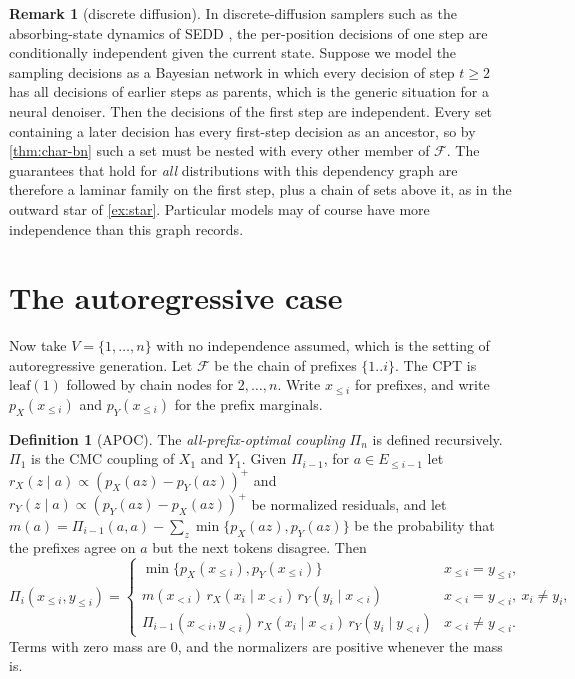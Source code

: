 \documentclass[11pt]{article}
\theoremstyle{definition}
\newtheorem{definition}[theorem]{Definition}
\newtheorem{remark}[theorem]{Remark}
\newcommand{\pX}{p_X}
\newcommand{\pY}{p_Y}
\newcommand{\pos}[1]{\left(#1\right)^{+}}
\newcommand{\Var}{V}
\newcommand{\F}{\mathcal{F}}
\begin{document}
\begin{remark}[discrete diffusion]
In discrete-diffusion samplers such as the absorbing-state dynamics of SEDD
\cite{lou2024discrete}, the per-position decisions of one step are
conditionally independent given the current state. Suppose we model the
sampling decisions as a Bayesian network in which every decision of step
$t\ge2$ has all decisions of earlier steps as parents, which is the generic
situation for a neural denoiser. Then the decisions of the first step are
independent. Every set containing a later decision has every first-step
decision as an ancestor, so by \cref{thm:char-bn} such a set must be nested with
every other member of $\F$. The guarantees that hold for \emph{all} distributions
with this dependency graph are therefore a laminar family on the first step,
plus a chain of sets above it, as in the outward star of \cref{ex:star}.
Particular models may of course have more independence than this graph records.
\end{remark}

\section{The autoregressive case}\label{sec:autoregressive}

Now take $\Var=\{1,\dots,n\}$ with no independence assumed, which is the
setting of autoregressive generation. Let $\F$ be the chain of prefixes
$\{1..i\}$. The CPT is $\mathrm{leaf}(1)$ followed by chain nodes for
$2,\dots,n$. Write $x_{\le i}$ for prefixes, and write $\pX(x_{\le i})$ and
$\pY(x_{\le i})$ for the prefix marginals.

\begin{definition}[APOC]
The \emph{all-prefix-optimal coupling} $\Pi_n$ is defined recursively. $\Pi_1$
is the CMC coupling of $X_1$ and $Y_1$. Given $\Pi_{i-1}$, for $a\in E_{\le i-1}$
let
$r_X(z\mid a)\propto\pos{\pX(az)-\pY(az)}$ and $r_Y(z\mid a)\propto\pos{\pY(az)-\pX(az)}$
be normalized residuals, and let
$m(a)=\Pi_{i-1}(a,a)-\sum_z\min\{\pX(az),\pY(az)\}$ be the probability that the
prefixes agree on $a$ but the next tokens disagree. Then
\[
\Pi_i(x_{\le i},y_{\le i})=
\begin{cases}
\min\{\pX(x_{\le i}),\pY(x_{\le i})\} & x_{\le i}=y_{\le i},\\[3pt]
m(x_{<i})\,r_X(x_i\mid x_{<i})\,r_Y(y_i\mid x_{<i}) & x_{<i}=y_{<i},\ x_i\neq y_i,\\[3pt]
\Pi_{i-1}(x_{<i},y_{<i})\,r_X(x_i\mid x_{<i})\,r_Y(y_i\mid y_{<i}) & x_{<i}\ne y_{<i}.
\end{cases}
\]
Terms with zero mass are $0$, and the normalizers are positive whenever the mass
is.
\end{definition}
\end{document}
